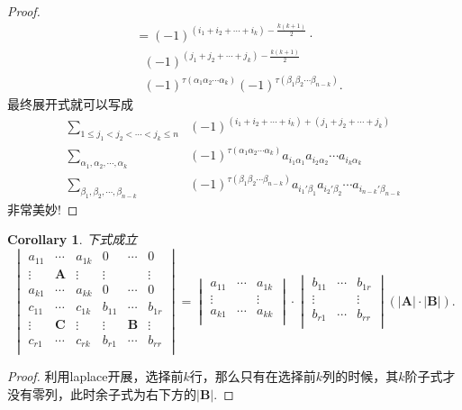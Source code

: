 \documentclass{article}
\newtheorem{corollary}[theorem]{Corollary}
\newcommand{\mbf}[1]{\bm{#1}}
\begin{document}
\begin{proof}
$$\begin{array}{ll}
&= (-1)^{(i_1 + i_2 + \cdots + i_k)-\frac{k(k+1)}{2}} \cdot \\
&~~~(-1)^{(j_1 + j_2 + \cdots + j_k) - \frac{k(k+1)}{2}} \\
&~~~(-1)^{\tau(\alpha_1\alpha_2\cdots\alpha_k)}(-1)^{\tau(\beta_1\beta_2\cdots\beta_{n-k})}.
\end{array}
$$
最终展开式就可以写成
$$
\begin{array}{cl}
\sum\limits_{1\leq j_1 < j_2 < \cdots < j_k \leq n}&(-1)^{(i_1+i_2+\cdots+i_k)+(j_1+j_2+\cdots+j_k)} \\
\sum\limits_{\alpha_1,\alpha_2,\cdots,\alpha_k}&(-1)^{\tau(\alpha_1\alpha_2\cdots\alpha_k)}a_{i_1\alpha_1}a_{i_2\alpha_2}\cdots a_{i_k\alpha_k}\\ \sum\limits_{\beta_1,\beta_2,\cdots,\beta_{n-k}}& (-1)^{\tau(\beta_1\beta_2\cdots\beta_{n-k})} a_{i_1'\beta_1}a_{i_2'\beta_2}\cdots a_{i_{n-k}'\beta_{n-k}}
\end{array}
$$
{\color{blue}非常美妙!}
\end{proof}

\begin{corollary}
\rm 下式成立
$$
\begin{vmatrix}
a_{11} &\cdots &a_{1k} & 0 & \cdots & 0 \\
\vdots & \mbf{A} & \vdots & \vdots &  &\vdots\\
a_{k1} &\cdots& a_{kk} & 0 & \cdots & 0 \\
c_{11} &\cdots &c_{1k} & b_{11} & \cdots & b_{1r} \\
\vdots & \mbf{C} & \vdots & \vdots & \mbf{B} &\vdots \\
c_{r1} &\cdots& c_{rk} & b_{r1} & \cdots & b_{rr} \\
\end{vmatrix} = 
\begin{vmatrix}
a_{11} &\cdots &a_{1k} \\
\vdots & & \vdots  \\
a_{k1} &\cdots& a_{kk} \\
\end{vmatrix} \cdot
\begin{vmatrix}
b_{11} &\cdots &b_{1r} \\
\vdots & & \vdots  \\
b_{r1} &\cdots& b_{rr} \\
\end{vmatrix}(|\mbf{A}|\cdot|\mbf{B}|).
$$ 
\end{corollary}

\begin{proof}
利用laplace开展，选择前$k$行，那么只有在选择前$k$列的时候，其$k$阶子式才没有零列，此时余子式为右下方的$|\mbf{B}|$. 
\end{proof}
\end{document}

